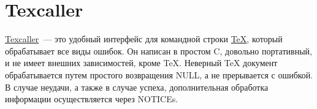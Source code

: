 \section{Texcaller}

\href{http://www.profv.de/texcaller/}{Texcaller}~--- это удобный интерфейс для командной строки \href{https://ru.wikipedia.org/wiki/TeX}{TeX}, который обрабатывает все виды ошибок. Он написан в простом C, довольно портативный, и не имеет внешних зависимостей, кроме TeX. Неверный TeX документ обрабатывается путем простого возвращения NULL, а не прерывается с ошибкой. В случае неудачи, а также в случае успеха, дополнительная обработка информации осуществляется через NOTICEs.